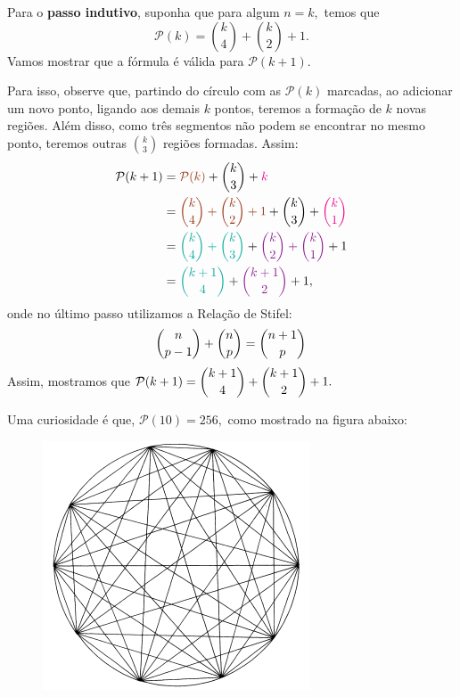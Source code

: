 \documentclass[12pt, a4paper]{article}
\begin{document}
\begin{solution}
Para o \textbf{passo indutivo}, suponha que para algum $n = k,$ temos que
\[
\mathcal{P}(k) = \binom{k}{4} + \binom{k}{2} + 1.
\]
Vamos mostrar que a fórmula é válida para $\mathcal{P}(k+1).$

Para isso, observe que, partindo do círculo com as $\mathcal{P}(k)$ marcadas, ao adicionar um novo ponto, ligando aos demais $k$ pontos, teremos a formação de $k$ novas regiões. Além disso, como três segmentos não podem se encontrar no mesmo ponto, teremos outras $\binom{k}{3}$ regiões formadas. Assim:
\begin{align*}
    \mathcal{P}(k+1) &= \textcolor{RawSienna}{\mathcal{P}(k)} + \dbinom{k}{3} + \textcolor{Magenta}{k}
    \\&= \textcolor{RawSienna}{\dbinom{k}{4} + \dbinom{k}{2} + 1} + \dbinom{k}{3} + \textcolor{Magenta}{\dbinom{k}{1}}
    \\&= \textcolor{JungleGreen}{\dbinom{k}{4} + \dbinom{k}{3}} + \textcolor{Plum}{\dbinom{k}{2} + \dbinom{k}{1}} + 1 
    \\&= \textcolor{JungleGreen}{\dbinom{k+1}{4}} + \textcolor{Plum}{\dbinom{k+1}{2}} + 1,
\end{align*}
onde no último passo utilizamos a Relação de Stifel:
\[
\dbinom{n}{p-1} + \dbinom{n}{p} = \dbinom{n+1}{p}
\]
Assim, mostramos que $\mathcal{P}(k+1) = \dbinom{k+1}{4} + \dbinom{k+1}{2} + 1.$

Uma curiosidade é que, $\mathcal{P}(10) = 256,$ como mostrado na figura abaixo:
\begin{figure}[!htb]
    \centering
    \includegraphics[scale=0.90]{Listas/lista_1ex182.png}
    \label{figuraa}
\end{figure}
\end{solution}
\end{document}
